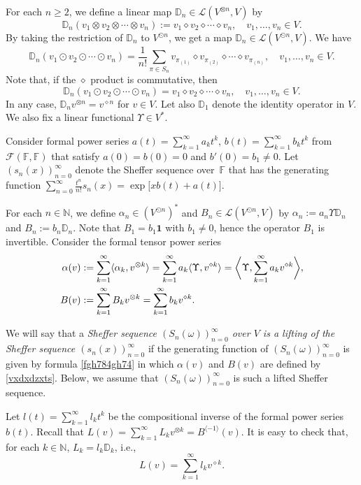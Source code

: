 \documentclass[12pt]{article}
\theoremstyle{remark}
\theoremstyle{remark}
\theoremstyle{remark}
\begin{document}
For each $n\geq 2$, we define a linear map $\mathbb D_n\in\mathcal L(V^{\otimes n}, V)$ by 
$$\mathbb D_n(v_1\otimes v_2\otimes \cdots\otimes v_n):=v_1\diamond v_2\diamond \cdots \diamond v_n,\quad v_1,\dots,v_n\in V.$$
By taking the restriction of $\mathbb D_n$ to $V^{\odot n}$, we get a map $\mathbb D_n\in\mathcal L(V^{\odot n}, V)$. 
We have $$\mathbb D_n(v_1\odot v_2\odot\cdots\odot v_n)=\frac 1{n!}\sum_{\pi\in S_n}v_{\pi_{(1)}}\diamond v_{\pi_{(2)}}\diamond \dotsm \diamond v_{\pi_{(n)}},\quad v_1,\dots,v_n\in V.$$
Note that, if the $\diamond$ product is commutative, then
$$\mathbb D_n(v_1\odot v_2\odot\cdots\odot v_n)=v_1\diamond v_2\diamond \cdots\diamond v_n,\quad v_1,\dots,v_n\in V.$$
In any case, $\mathbb D_nv^{\otimes n}=v^{\diamond n}$ for $v\in V$. 
Let also $\mathbb D_1$ denote the identity operator in $V$. 
We also fix a linear functional $\Upsilon\in V^*$.

Consider formal power series $a(t)=\sum_{k=1}^\infty a_kt^k$, $b(t)=\sum_{k=1}^\infty b_kt^k$ from $ \mathcal F(\mathbb F,\mathbb F)$ that satisfy $a(0)=b(0)=0$ and $b'(0)=b_1\ne0$. Let $(s_n(x))_{n=0}^\infty$ denote the Sheffer sequence  over~$\mathbb F$ that has the generating function 
$\sum_{n=0}^\infty \frac{t^n}{n!}s_n(x)=\exp\big[xb(t)+a(t)\big]$.


For each $n\in \mathbb N$, we define $\alpha_n\in (V^{\odot n})^*$ and $B_n\in \mathcal L(V^{\odot n},V)$  by
$\alpha_n:=a_n \Upsilon \mathbb D_n$ and $B_n:=b_n\mathbb D_n$. Note that $B_1=b_1\mathbf 1$ with $b_1\ne0$, hence the operator $B_1$ is invertible.  
Consider the   formal tensor power series 
\begin{align}
\alpha(v)&:=\sum_{k=1}^\infty \langle \alpha_k,v^{\otimes k}\rangle
=\sum_{k=1}^\infty a_k \langle \Upsilon, v^{\diamond k}\rangle=\bigg\langle\Upsilon,\sum_{k=1}^\infty a_k v^{\diamond k}\bigg\rangle,\notag\\
B(v)&:=\sum_{k=1}^\infty B_kv^{\otimes k}=\sum_{k=1}^\infty b_k v^{\diamond k}.\label{vxdxdzxts}
\end{align}




We will say that a {\it Sheffer sequence $(S_n(\omega))_{n=0}^\infty$ over $V$ is a lifting of the Sheffer sequence $(s_n(x))_{n=0}^\infty$} if the generating function of $(S_n(\omega))_{n=0}^\infty$ is given by formula  \eqref{fgh784gh74} in which $\alpha(v)$ and $B(v)$ are defined by \eqref{vxdxdzxts}. Below, we assume that $(S_n(\omega))_{n=0}^\infty$ is such a lifted Sheffer sequence. 

Let $l(t)=\sum_{k=1}^\infty l_kt^k$ be the compositional inverse of the formal power series $b(t)$. Recall that $L(v)=\sum_{k=1}^\infty L_kv^{\otimes k}=B^{\langle-1\rangle}(v)$. It is easy to check that, for each $k\in\mathbb N$, $L_k=l_k\mathbb D_k$, i.e.,
\begin{equation}\label{xresare5w6u}
L(v)=\sum_{k=1}^\infty l_kv^{\diamond k}. 
\end{equation} 
\end{document}

